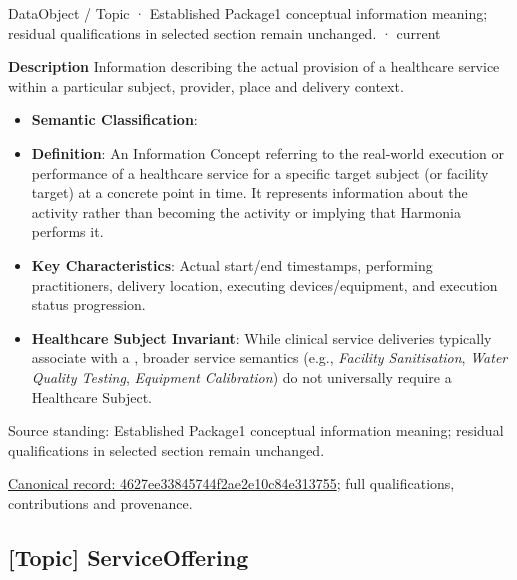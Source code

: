\label{element:4627ee33845744f2ae2e10c84e313755}
{\small DataObject / Topic · Established Package1 conceptual information meaning; residual qualifications in selected section remain unchanged. · current}\par

\textbf{Description}
Information describing the actual provision of a healthcare service within a particular subject, provider, place and delivery context.



\begin{itemize}


\item \textbf{Semantic Classification}: \texttt{}

\item \textbf{Definition}: An Information Concept referring to the real-world execution or performance of a healthcare service for a specific target subject (or facility target) at a concrete point in time. It represents information about the activity rather than becoming the activity or implying that Harmonia performs it.

\item \textbf{Key Characteristics}: Actual start/end timestamps, performing practitioners, delivery location, executing devices/equipment, and execution status progression.

\item \textbf{Healthcare Subject Invariant}: While clinical service deliveries typically associate with a \texttt{}, broader service semantics (e.g., \emph{Facility Sanitisation}, \emph{Water Quality Testing}, \emph{Equipment Calibration}) do not universally require a Healthcare Subject.

\end{itemize}


Source standing: Established Package1 conceptual information meaning; residual qualifications in selected section remain unchanged.


{\footnotesize \href{../../../../continuum/application/data-object/topic/4627ee33845744f2ae2e10c84e313755.md}{Canonical record: 4627ee33845744f2ae2e10c84e313755}; full qualifications, contributions and provenance.}\par
\subsection{[Topic] ServiceOffering}

